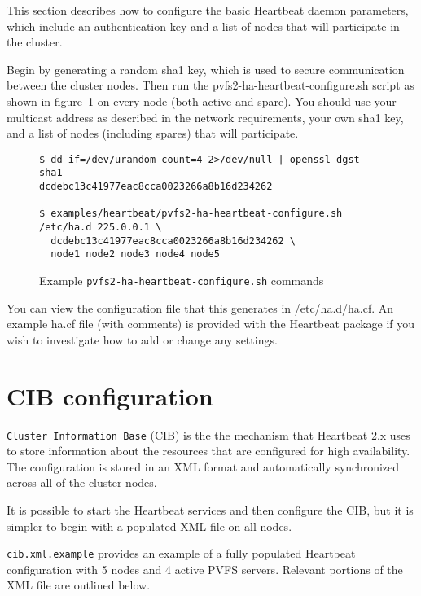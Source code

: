 \documentclass[11pt]{article}
\begin{document}
This section describes how to configure the basic Heartbeat daemon
parameters, which include an authentication key and a list of nodes that
will participate in the cluster.

Begin by generating a random sha1 key, which is used to secure
communication between the cluster nodes.  Then run the 
pvfs2-ha-heartbeat-configure.sh script as shown in
figure~\ref{fig:haconf} on every node (both active and spare).  You
should use your multicast address as described in the network
requirements, your own sha1 key, and a list of
nodes (including spares) that will participate.


\begin{figure}
\begin{scriptsize}
\begin{verbatim}
$ dd if=/dev/urandom count=4 2>/dev/null | openssl dgst -sha1
dcdebc13c41977eac8cca0023266a8b16d234262

$ examples/heartbeat/pvfs2-ha-heartbeat-configure.sh /etc/ha.d 225.0.0.1 \
  dcdebc13c41977eac8cca0023266a8b16d234262 \
  node1 node2 node3 node4 node5
\end{verbatim}
\end{scriptsize}
\caption{Example \texttt{pvfs2-ha-heartbeat-configure.sh} commands}
\label{fig:haconf}
\end{figure}

You can view the configuration file that this generates in
/etc/ha.d/ha.cf.  An example ha.cf file (with comments) is provided with
the Heartbeat package if you wish to investigate how to add or change any settings.

\section{CIB configuration}

\texttt{Cluster Information Base} (CIB) is the the mechanism that
Heartbeat 2.x uses to store information about the resources that are 
configured for high availability.  The configuration is stored in an
XML format and automatically synchronized across all of the cluster
nodes.

It is possible to start the Heartbeat services and then configure the
CIB, but it is simpler to begin with a populated XML file on all nodes.

\texttt{cib.xml.example} provides an example of a fully populated
Heartbeat configuration with 5 nodes and 4 active PVFS servers.  Relevant
portions of the XML file are outlined below.
\end{document}
